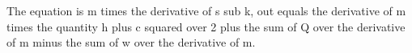 The equation is m times the derivative of s sub k, out equals the derivative of m times the quantity h plus c squared over 2 plus the sum of Q over the derivative of m minus the sum of w over the derivative of m.
